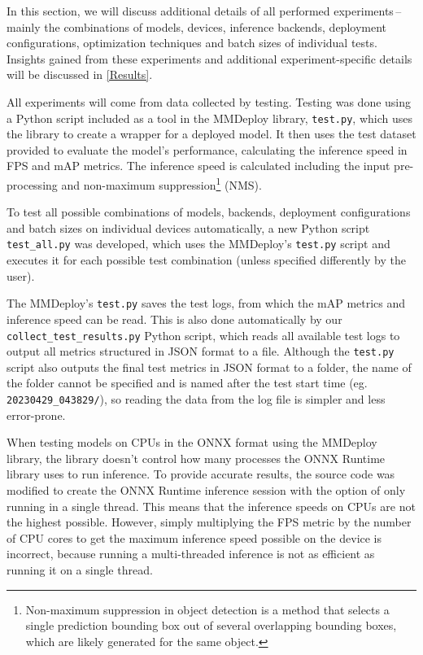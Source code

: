 In this section, we will discuss additional details of all performed
experiments\,--\,mainly the combinations of models, devices, inference backends,
deployment configurations, optimization techniques and batch sizes of individual
tests. Insights gained from these experiments and additional experiment-specific
details will be discussed in \autoref{Results}.

All experiments will come from data collected by testing. Testing was done using
a Python script included as a tool in the MMDeploy library, \texttt{test.py},
which uses the library to create a wrapper for a deployed model. It then uses
the test dataset provided to evaluate the model's performance, calculating the
inference speed in FPS and mAP metrics. The inference speed is calculated
including the input pre-processing and non-maximum
suppression\footnote{Non-maximum suppression in object detection is a method
that selects a single prediction bounding box out of several overlapping
bounding boxes, which are likely generated for the same object.} (NMS).

To test all possible combinations of models, backends, deployment configurations
and batch sizes on individual devices automatically, a new Python script
\texttt{test\_all.py} was developed, which uses the MMDeploy's \texttt{test.py}
script and executes it for each possible test combination (unless specified
differently by the user).

The MMDeploy's \texttt{test.py} saves the test logs, from which the mAP metrics
and inference speed can be read. This is also done automatically by our
\texttt{collect\_test\_results.py} Python script, which reads all available test
logs to output all metrics structured in JSON format to a file. Although the
\texttt{test.py} script also outputs the final test metrics in JSON format to a
folder, the name of the folder cannot be specified and is named after the test
start time (eg. \texttt{20230429\_043829/}), so reading the data from the log file
is simpler and less error-prone.

When testing models on CPUs in the ONNX format using the MMDeploy library, the
library doesn't control how many processes the ONNX Runtime library uses to run
inference. To provide accurate results, the source code was modified to create
the ONNX Runtime inference session with the option of only running in a single
thread. This means that the inference speeds on CPUs are not the highest
possible. However, simply multiplying the FPS metric by the number of CPU cores
to get the maximum inference speed possible on the device is incorrect, because
running a multi-threaded inference is not as efficient as running it on a single
thread.


